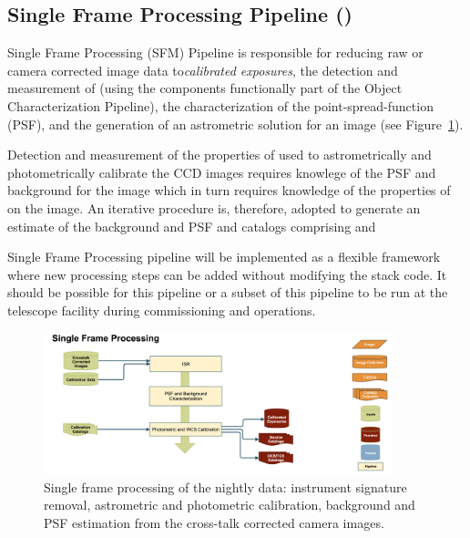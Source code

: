 \subsection{Single Frame Processing Pipeline (\wbsSFM)}
\label{sec:apSingleFrameProcessing}

Single Frame Processing (SFM) Pipeline is responsible for reducing raw or camera corrected image data to\emph{calibrated exposures}, the detection and measurement of \Sources (using the components functionally  part of the Object Characterization Pipeline), the characterization of the point-spread-function (PSF), and the generation of an astrometric solution for an image (see Figure~\ref{fig:apSFM}).

Detection and measurement of the properties of \Sources used to astrometrically and photometrically calibrate the CCD images requires knowlege of the PSF and background for the image which in turn requires knowledge of the properties of \Sources on the image. An iterative procedure is, therefore, adopted to generate an estimate of the background and PSF and \Source catalogs comprising \hyperref[sec:apPSFBackground]{}  and \hyperref[sec:apSourcemeasurement]{}

Single Frame Processing pipeline will be implemented as a flexible framework where new processing steps can be added without modifying the stack code. It should be possible for this pipeline or a subset of this pipeline to be run at the telescope facility during commissioning and operations.  

\begin{figure}[th]
\begin{center}
\includegraphics[width=0.9\textwidth]{figures/SFM.png}
\caption{\label{fig:apSFM} Single frame processing of the nightly data: instrument signature removal, astrometric and photometric calibration, background and PSF estimation from the cross-talk corrected camera images.}
\end{center}
\end{figure}


